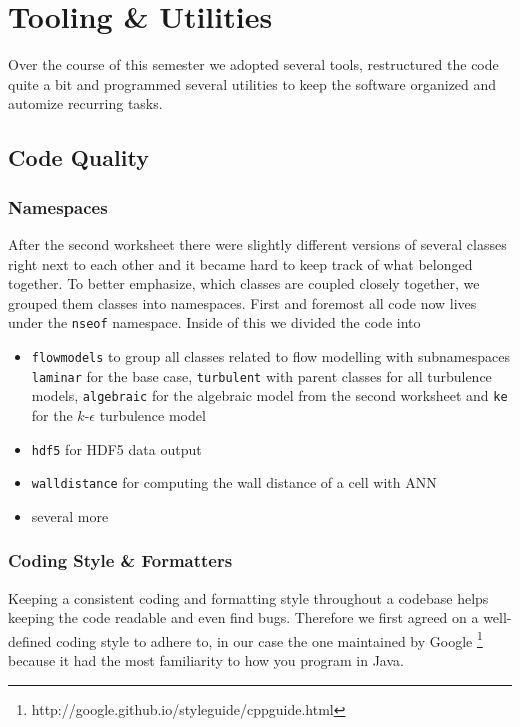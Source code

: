 \chapter{Tooling \& Utilities}
\label{cha:tooling}

Over the course of this semester we adopted several tools, restructured the code
quite a bit and programmed several utilities to keep the software organized and
automize recurring tasks.

\section{Code Quality}

\subsection{Namespaces}

After the second worksheet there were slightly different versions of several
classes right next to each other and it became hard to keep track of what
belonged together. To better emphasize, which classes are coupled closely
together, we grouped them classes into namespaces. First and foremost all code
now lives under the \texttt{nseof} namespace. Inside of this we divided the code
into

\begin{itemize}
\item \texttt{flowmodels} to group all classes related to flow modelling with
  subnamespaces \texttt{laminar} for the base case, \texttt{turbulent} with
  parent classes for all turbulence models, \texttt{algebraic} for the algebraic
  model from the second worksheet and \texttt{ke} for the $k$-$\epsilon$
  turbulence model
\item \texttt{hdf5} for HDF5 data output
\item \texttt{walldistance} for computing the wall distance of a cell with ANN
\item several more
\end{itemize}

\subsection{Coding Style \& Formatters}

Keeping a consistent coding and formatting style throughout a codebase helps
keeping the code readable and even find bugs. Therefore we first agreed on a
well-defined coding style to adhere to, in our case the one maintained by Google
\footnote{http://google.github.io/styleguide/cppguide.html} because it had the
most familiarity to how you program in Java.

